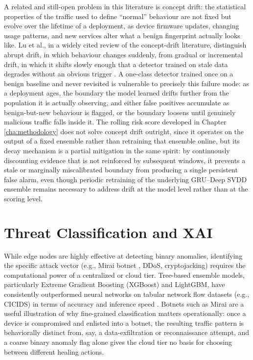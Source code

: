 A related and still-open problem in this literature is concept drift: the statistical properties of the traffic used to define ``normal'' behaviour are not fixed but evolve over the lifetime of a deployment, as device firmware updates, changing usage patterns, and new services alter what a benign fingerprint actually looks like. Lu et al., in a widely cited review of the concept-drift literature, distinguish abrupt drift, in which behaviour changes suddenly, from gradual or incremental drift, in which it shifts slowly enough that a detector trained on stale data degrades without an obvious trigger \cite{Lu2018}. A one-class detector trained once on a benign baseline and never revisited is vulnerable to precisely this failure mode: as a deployment ages, the boundary the model learned drifts further from the population it is actually observing, and either false positives accumulate as benign-but-new behaviour is flagged, or the boundary loosens until genuinely malicious traffic falls inside it. The rolling risk score developed in Chapter \ref{cha:methodology} does not solve concept drift outright, since it operates on the output of a fixed ensemble rather than retraining that ensemble online, but its decay mechanism is a partial mitigation in the same spirit: by continuously discounting evidence that is not reinforced by subsequent windows, it prevents a stale or marginally miscalibrated boundary from producing a single persistent false alarm, even though periodic retraining of the underlying GRU--Deep SVDD ensemble remains necessary to address drift at the model level rather than at the scoring level.

\section{Threat Classification and XAI}

While edge nodes are highly effective at detecting binary anomalies, identifying the specific attack vector (e.g., Mirai botnet \cite{Antonakakis2017}, DDoS, cryptojacking) requires the computational power of a centralized or cloud tier. Tree-based ensemble models, particularly Extreme Gradient Boosting (XGBoost) and LightGBM, have consistently outperformed neural networks on tabular network flow datasets (e.g., CICIDS) in terms of accuracy and inference speed \cite{Sama2025}. Botnets such as Mirai are a useful illustration of why fine-grained classification matters operationally: once a device is compromised and enlisted into a botnet, the resulting traffic pattern is behaviorally distinct from, say, a data-exfiltration or reconnaissance attempt, and a coarse binary anomaly flag alone gives the cloud tier no basis for choosing between different healing actions.


